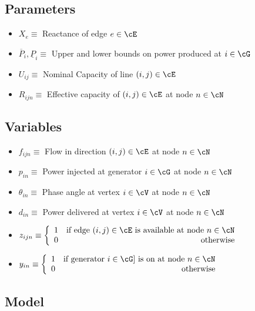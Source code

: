 \subsection{Parameters}

\begin{itemize}
\item $X_e \equiv $ Reactance of edge $e \in \cE$
\item $ \overline{P}_i, \underline{P}_i \equiv $ Upper and lower bounds on power produced at $ i \in \cG $
\item $ U_{ij} \equiv$ Nominal Capacity of line $(i,j) \in \cE$
\item $ R_{ijn} \equiv$  Effective capacity of $(i,j) \in \cE$ at node $n \in \cN$
\end{itemize}


\subsection{Variables}

\begin{itemize}
\item $f_{ijn} \equiv $ Flow in direction $(i,j) \in \cE$ at node $ n \in \cN $
\item $p_{in} \equiv $ Power injected at generator $i \in \cG$ at node $n \in \cN$
\item $\theta_{in} \equiv $ Phase angle at vertex $i \in \cV$ at node $n \in \cN$
\item $d_{in} \equiv $ Power delivered at vertex $i \in \cV$ at node $n \in \cN$
\item $z_{ijn} \equiv  
	\left\{ 
	\begin{array}{lr}
			1 & \mbox{if edge } (i,j) \in \cE \mbox{ is available at node } n \in \cN\\
			 0 & \mbox{otherwise}
	\end{array}
	\right.$
\item $y_{in} \equiv  
	\left\{ 
	\begin{array}{lr}
			1 & \mbox{if generator } i \in \cG] \mbox{ is on at node } n \in \cN\\
			 0 & \mbox{otherwise}
	\end{array}
	\right.$
\end{itemize}


\subsection{Model}


